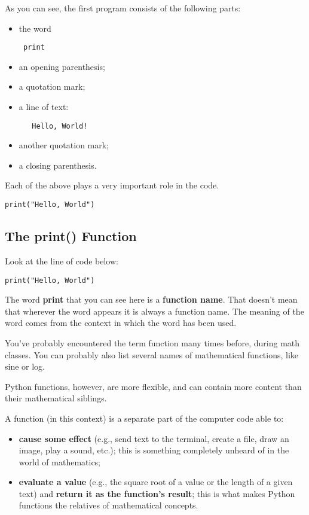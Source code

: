 \documentclass[a4paper,10pt]{article}
\begin{document}
As you can see, the first program consists of the following parts:
\begin{itemize}
 \item the word
 \begin{verbatim}
 print
 \end{verbatim}
 \item an opening parenthesis;
 \item a quotation mark;
 \item a line of text:
  \begin{verbatim}
   Hello, World!
  \end{verbatim}
 \item another quotation mark;
 \item a closing parenthesis.
\end{itemize}

Each of the above plays a very important role in the code.

\begin{verbatim}
print("Hello, World")
\end{verbatim}

\subsection{The print() Function}
Look at the line of code below:
\begin{verbatim}
print("Hello, World")
\end{verbatim}
The word \textbf{print} that you can see here is a \textbf{function name}. That doesn't mean that wherever the word appears it is always a function name. The meaning of the word comes from the context in which the word has been used.
\newline

You've probably encountered the term function many times before, during math classes. You can probably also list several names of mathematical functions, like sine or log.
\newline

Python functions, however, are more flexible, and can contain more content than their mathematical siblings.
\newline

A function (in this context) is a separate part of the computer code able to:
\begin{itemize}
 \item \textbf{cause some effect} (e.g., send text to the terminal, create a file, draw an image, play a sound, etc.); this is something completely unheard of in the world of mathematics;
 \item \textbf{evaluate a value} (e.g., the square root of a value or the length of a given text) and \textbf{return it as the function's result}; this is what makes Python functions the relatives of mathematical concepts.
\end{itemize}
\end{document}
